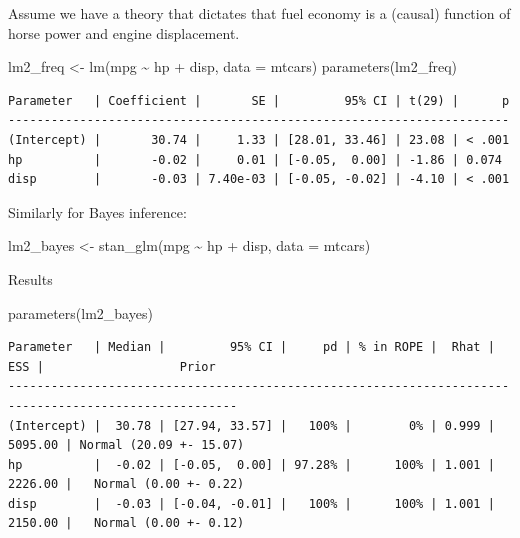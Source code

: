 \documentclass[
  letterpaper,
  DIV=11,
  numbers=noendperiod]{scrreprt}
\newenvironment{Shaded}{\begin{snugshade}}{\end{snugshade}}
\newcommand{\AttributeTok}[1]{\textcolor[rgb]{0.40,0.45,0.13}{#1}}
\newcommand{\FunctionTok}[1]{\textcolor[rgb]{0.28,0.35,0.67}{#1}}
\newcommand{\NormalTok}[1]{\textcolor[rgb]{0.00,0.23,0.31}{#1}}
\newcommand{\OtherTok}[1]{\textcolor[rgb]{0.00,0.23,0.31}{#1}}
\newcommand{\SpecialCharTok}[1]{\textcolor[rgb]{0.37,0.37,0.37}{#1}}
\theoremstyle{definition}
\theoremstyle{definition}
\theoremstyle{remark}
\begin{document}
Assume we have a theory that dictates that fuel economy is a (causal)
function of horse power and engine displacement.

\begin{Shaded}
\begin{Highlighting}[]
\NormalTok{lm2\_freq }\OtherTok{\textless{}{-}} \FunctionTok{lm}\NormalTok{(mpg }\SpecialCharTok{\textasciitilde{}}\NormalTok{ hp }\SpecialCharTok{+}\NormalTok{ disp, }\AttributeTok{data =}\NormalTok{ mtcars)}
\FunctionTok{parameters}\NormalTok{(lm2\_freq)}
\end{Highlighting}
\end{Shaded}

\begin{verbatim}
Parameter   | Coefficient |       SE |         95% CI | t(29) |      p
----------------------------------------------------------------------
(Intercept) |       30.74 |     1.33 | [28.01, 33.46] | 23.08 | < .001
hp          |       -0.02 |     0.01 | [-0.05,  0.00] | -1.86 | 0.074 
disp        |       -0.03 | 7.40e-03 | [-0.05, -0.02] | -4.10 | < .001
\end{verbatim}

Similarly for Bayes inference:

\begin{Shaded}
\begin{Highlighting}[]
\NormalTok{lm2\_bayes }\OtherTok{\textless{}{-}} \FunctionTok{stan\_glm}\NormalTok{(mpg }\SpecialCharTok{\textasciitilde{}}\NormalTok{ hp }\SpecialCharTok{+}\NormalTok{ disp, }\AttributeTok{data =}\NormalTok{ mtcars)}
\end{Highlighting}
\end{Shaded}

Results

\begin{Shaded}
\begin{Highlighting}[]
\FunctionTok{parameters}\NormalTok{(lm2\_bayes)}
\end{Highlighting}
\end{Shaded}

\begin{verbatim}
Parameter   | Median |         95% CI |     pd | % in ROPE |  Rhat |     ESS |                   Prior
------------------------------------------------------------------------------------------------------
(Intercept) |  30.78 | [27.94, 33.57] |   100% |        0% | 0.999 | 5095.00 | Normal (20.09 +- 15.07)
hp          |  -0.02 | [-0.05,  0.00] | 97.28% |      100% | 1.001 | 2226.00 |   Normal (0.00 +- 0.22)
disp        |  -0.03 | [-0.04, -0.01] |   100% |      100% | 1.001 | 2150.00 |   Normal (0.00 +- 0.12)
\end{verbatim}
\end{document}
